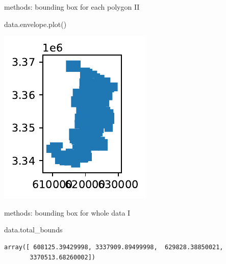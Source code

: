 \documentclass[
  ignorenonframetext,
]{beamer}
\newenvironment{Shaded}{\begin{snugshade}}{\end{snugshade}}
\newcommand{\NormalTok}[1]{\textcolor[rgb]{0.00,0.23,0.31}{#1}}
\begin{document}
\begin{frame}[fragile]{methods: bounding box for each polygon II}
\label{methods-bounding-box-for-each-polygon-ii}
\begin{Shaded}
\begin{Highlighting}[]
\NormalTok{data.envelope.plot()}
\end{Highlighting}
\end{Shaded}

\includegraphics{spatial_2_files/figure-beamer/cell-21-output-1.pdf}
\end{frame}

\begin{frame}[fragile]{methods: bounding box for whole data I}
\label{methods-bounding-box-for-whole-data-i}
\begin{Shaded}
\begin{Highlighting}[]
\NormalTok{data.total\_bounds}
\end{Highlighting}
\end{Shaded}

\begin{verbatim}
array([ 608125.39429998, 3337909.89499998,  629828.38850021,
       3370513.68260002])
\end{verbatim}
\end{frame}
\end{document}
